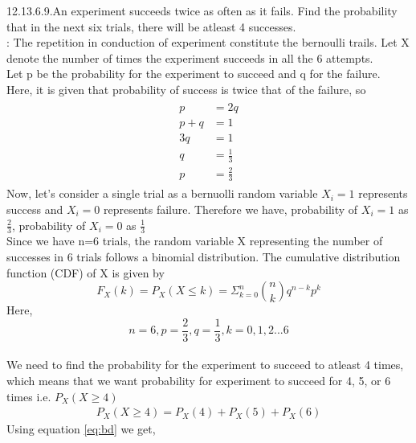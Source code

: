 \documentclass[journal,12pt,twocolumn]{IEEEtran}
\begin{document}
\renewcommand{\thefigure}{\theenumi}
\renewcommand{\thetable}{\theenumi}
12.13.6.9.An experiment succeeds twice as often as it fails. Find the probability that in the next six trials, there will be atleast 4 successes.
\\ \solution:
The repetition in conduction of experiment constitute the bernoulli trails. Let X denote the number of times the experiment succeeds in all the 6 attempts.\\
Let p be the probability for the experiment to succeed and q for the failure.\\
Here, it is given that probability of success is twice that of the failure, so 
\begin{align}
\begin{split}
p&=2q\\
p+q&=1\\
3q&=1\\
q&= \frac{1}{3}\\
p&= \frac{2}{3}
\end{split}
\end{align}
Now, let's consider a single trial as a bernuolli random variable $X_{i}=1$ represents success and $X_{i}=0$ represents failure. Therefore we have,
probability of $X_{i}=1$ as $\frac{2}{3}$, 
probability of $X_{i}=0$ as $\frac{1}{3}$\\
Since we have n=6 trials, the random variable X representing the number of successes in 6 trials follows a binomial distribution. The cumulative distribution function (CDF) of X is given by
\begin{equation}
\label{eq:bd}
F_X(k)= P_X(X \le k)= \Sigma_{k=0}^n\binom{n}{k}q^{n-k}p^{k}
\end{equation}
Here, $$n=6, p= \frac{2}{3}, q= \frac{1}{3}, k= 0,1,2...6$$\\
We need to find the probability for the experiment to succeed to atleast 4 times, which means that we want probability for experiment to succeed for 4, 5, or 6 times i.e. $P_X(X \ge 4)$
\begin{align}
P_X(X \ge 4)= P_X(4)+ P_X(5)+ P_X(6)
\end{align}
Using equation \ref{eq:bd} we get,
\end{document}

